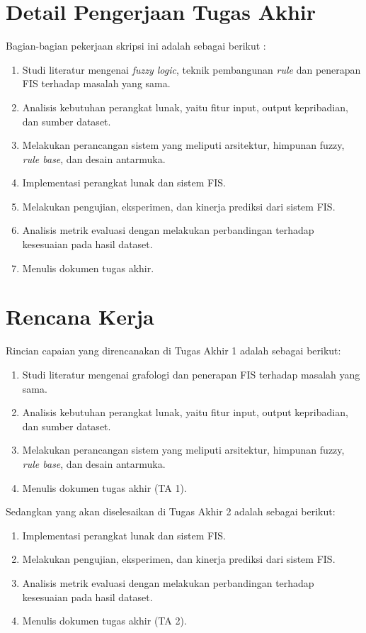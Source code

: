 \documentclass[a4paper,twoside]{article}
\begin{document}
	\section{Detail Pengerjaan Tugas Akhir}
	
	Bagian-bagian pekerjaan skripsi ini adalah sebagai berikut :
	\begin{enumerate}
		\item Studi literatur mengenai \textit{fuzzy logic}, teknik pembangunan \textit{rule} dan penerapan FIS terhadap masalah yang sama.
		\item Analisis kebutuhan perangkat lunak, yaitu fitur input, output kepribadian, dan sumber dataset.
		\item Melakukan perancangan sistem yang meliputi arsitektur, himpunan fuzzy, \textit{rule base}, dan desain antarmuka.
		\item Implementasi perangkat lunak dan sistem FIS.
		\item Melakukan pengujian, eksperimen, dan kinerja prediksi dari sistem FIS.
		\item Analisis metrik evaluasi dengan melakukan perbandingan terhadap kesesuaian pada hasil dataset.
		\item Menulis dokumen tugas akhir.
	\end{enumerate}
	
	\section{Rencana Kerja}
	Rincian capaian yang direncanakan di Tugas Akhir 1 adalah sebagai berikut:
	\begin{enumerate}
		\item Studi literatur mengenai grafologi dan penerapan FIS terhadap masalah yang sama.
		\item Analisis kebutuhan perangkat lunak, yaitu fitur input, output kepribadian, dan sumber dataset.
		\item Melakukan perancangan sistem yang meliputi arsitektur, himpunan fuzzy, \textit{rule base}, dan desain antarmuka.
		\item Menulis dokumen tugas akhir (TA 1).
	\end{enumerate}
	
	Sedangkan yang akan diselesaikan di Tugas Akhir 2 adalah sebagai berikut:
	\begin{enumerate}
		\item Implementasi perangkat lunak dan sistem FIS.
		\item Melakukan pengujian, eksperimen, dan kinerja prediksi dari sistem FIS.
		\item Analisis metrik evaluasi dengan melakukan perbandingan terhadap kesesuaian pada hasil dataset.
		\item Menulis dokumen tugas akhir (TA 2).
	\end{enumerate}
	
\end{document}
